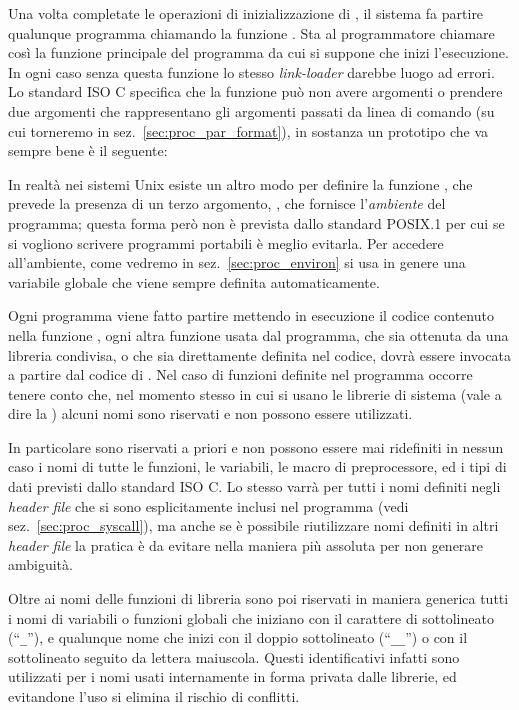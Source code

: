Una volta completate le operazioni di inizializzazione di , il
sistema fa partire qualunque programma chiamando la funzione . Sta
al programmatore chiamare così la funzione principale del programma da cui si
suppone che inizi l'esecuzione. In ogni caso senza questa funzione lo stesso
\textit{link-loader} darebbe luogo ad errori.  Lo standard ISO C specifica che
la funzione  può non avere argomenti o prendere due argomenti che
rappresentano gli argomenti passati da linea di comando (su cui torneremo in
sez.~\ref{sec:proc_par_format}), in sostanza un prototipo che va sempre bene è
il seguente:


In realtà nei sistemi Unix esiste un altro modo per definire la funzione
, che prevede la presenza di un terzo argomento, , che fornisce l'\textsl{ambiente} del programma; questa forma però
non è prevista dallo standard POSIX.1 per cui se si vogliono scrivere
programmi portabili è meglio evitarla. Per accedere all'ambiente, come vedremo
in sez.~\ref{sec:proc_environ} si usa in genere una variabile globale che
viene sempre definita automaticamente.

Ogni programma viene fatto partire mettendo in esecuzione il codice contenuto
nella funzione , ogni altra funzione usata dal programma, che sia
ottenuta da una libreria condivisa, o che sia direttamente definita nel
codice, dovrà essere invocata a partire dal codice di . Nel caso di
funzioni definite nel programma occorre tenere conto che, nel momento stesso
in cui si usano le librerie di sistema (vale a dire la ) alcuni
nomi sono riservati e non possono essere utilizzati. 

In particolare sono riservati a priori e non possono essere mai ridefiniti in
nessun caso i nomi di tutte le funzioni, le variabili, le macro di
preprocessore, ed i tipi di dati previsti dallo standard ISO C. Lo stesso
varrà per tutti i nomi definiti negli \textit{header file} che si sono
esplicitamente inclusi nel programma (vedi sez.~\ref{sec:proc_syscall}), ma
anche se è possibile riutilizzare nomi definiti in altri \textit{header file}
la pratica è da evitare nella maniera più assoluta per non generare ambiguità.

Oltre ai nomi delle funzioni di libreria sono poi riservati in maniera
generica tutti i nomi di variabili o funzioni globali che iniziano con il
carattere di sottolineato (``\texttt{\_}''), e qualunque nome che inizi con il
doppio sottolineato (``\texttt{\_\_}'') o con il sottolineato seguito da
lettera maiuscola. Questi identificativi infatti sono utilizzati per i nomi
usati internamente in forma privata dalle librerie, ed evitandone l'uso si
elimina il rischio di conflitti.

